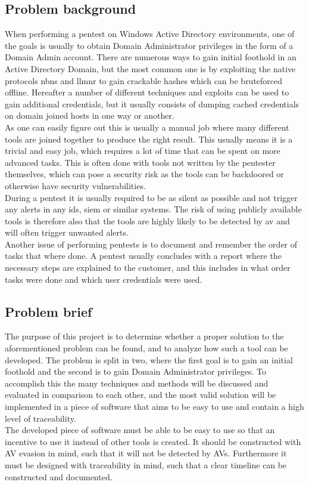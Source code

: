 \documentclass{article}
\begin{document}
\subsection{Problem background}
When performing a pentest on Windows Active Directory environments, one of the goals is usually to obtain Domain Administrator privileges in the form of a Domain Admin account. There are numerous ways to gain initial foothold in an Active Directory Domain, but the most common one is by exploiting the native protocols \gls{nbns} and \gls{llmnr}\cite{url:zero-to-domain-admin} to gain crackable hashes which can be bruteforced offline. Hereafter a number of different techniques and exploits can be used to gain additional credentials, but it usually consists of dumping cached credentials on domain joined hosts in one way or another.
\\
As one can easily figure out this is usually a manual job where many different tools are joined together to produce the right result. This usually means it is a trivial and easy job, which requires a lot of time that can be spent on more advanced tasks. This is often done with tools not written by the pentester themselves, which can pose a security risk as the tools can be backdoored or otherwise have security vulnerabilities.
\\
During a pentest it is usually required to be as silent as possible and not trigger any alerts in any \gls{ids}, \gls{siem} or similar systems. The risk of using publicly available tools is therefore also that the tools are highly likely to be detected by \gls{av} and will often trigger unwanted alerts.
\\
Another issue of performing pentests is to document and remember the order of tasks that where done. A pentest usually concludes with a report where the necessary steps are explained to the customer, and this includes in what order tasks were done and which user credentials were used.

\subsection{Problem brief}
The purpose of this project is to determine whether a proper solution to the aforementioned problem can be found, and to analyze how such a tool can be developed. The problem is split in two, where the first goal is to gain an initial foothold and the second is to gain Domain Administrator privileges. To accomplish this the many techniques and methods will be discussed and evaluated in comparison to each other, and the most valid solution will be implemented in a piece of software that aims to be easy to use and contain a high level of traceability.
\\
The developed piece of software must be able to be easy to use so that an incentive to use it instead of other tools is created. It should be constructed with AV evasion in mind, such that it will not be detected by AVs. Furthermore it must be designed with traceability in mind, such that a clear timeline can be constructed and documented.
\end{document}
